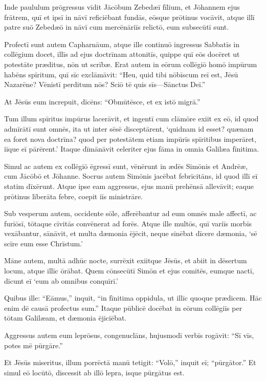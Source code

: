 \Versus Inde paululum prōgressus vīdit Jācōbum Zebedæī fīlium, et Jōhannem ejus frātrem, quī et ipsī in nāvī reficiēbant fundās,
\Versus eōsque prōtinus vocāvit, atque illī patre suō Zebedæō in nāvī cum mercēnāriīs relictō, eum subsecūtī sunt.

\Versus Profectī sunt autem Capharnāum, atque ille continuō ingressus Sabbatīs in collēgium docet,
\Versus illīs ad ejus doctrīnam attonitīs, quippe quī eōs docēret ut potestāte præditus, nōn ut scrībæ.
\Versus Erat autem in eōrum collēgiō homō impūrum habēns spīritum, quī sīc exclāmāvit:
\Versus ``Heu, quid tibi nōbīscum reī est, Jēsū Nazarēne? Vēnistī perditum nōs? Sciō tē quis sīs—Sānctus Deī.''

\Versus At Jēsūs eum increpuit, dīcēns: ``Obmūtēsce, et ex istō migrā.''

\Versus Tum illum spīritus impūrus lacerāvit, et ingentī cum clāmōre exiit ex eō,
\Versus id quod admīrātī sunt omnēs, ita ut inter sēsē disceptārent, `quidnam id esset? quænam ea foret nova doctrīna? quod per potestātem etiam impūrīs spīritibus imperāret, iīque eī pārērent.'
\Versus Itaque dīmānāvit celeriter ejus fāma in omnia Galilæa fīnitima.

\Versus Simul ac autem ex collēgiō ēgressī sunt, vēnērunt in ædēs Simōnis et Andrēæ, cum Jācōbō et Jōhanne.
\Versus Socrus autem Simōnis jacēbat febrīcitāns, id quod illī eī statim dīxērunt.
\Versus Atque ipse eam aggressus, ejus manū prehēnsā allevāvit; eaque prōtinus līberāta febre, coepit iīs ministrāre.

\Versus Sub vesperum autem, occidente sōle, afferēbantur ad eum omnēs male affectī, ac furiōsī,
\Versus tōtaque cīvitās convēnerat ad forēs.
\Versus Atque ille multōs, quī variīs morbīs vexābantur, sānāvit, et multa dæmonia ējēcit, neque sinēbat dīcere dæmonia, `sē scīre eum esse Chrīstum.'

\Versus Māne autem, multā adhūc nocte, surrēxit exiitque Jēsūs, et abiit in dēsertum locum, atque illīc ōrābat.
\Versus Quem cōnsecūtī Simōn et ejus comitēs,
\Versus eumque nactī, dīcunt eī `eum ab omnibus conquīrī.'

\Versus Quibus ille: ``Eāmus,'' inquit, ``in fīnitima oppidula, ut illīc quoque prædicem. Hāc enim dē causā profectus sum.''
\Versus Itaque pūblicē docēbat in eōrum collēgiīs per tōtam Galilæam, et dæmonia ējiciēbat.

\Versus Aggressus autem eum leprōsus, congenuclāns, hujusmodī verbīs rogāvit: ``Sī vīs, potes mē pūrgāre.''

\Versus Et Jēsūs miseritus, illum porrēctā manū tetigit: ``Volō,'' inquit eī; ``pūrgātor.''
\Versus Et simul eō locūtō, discessit ab illō lepra, isque pūrgātus est.

